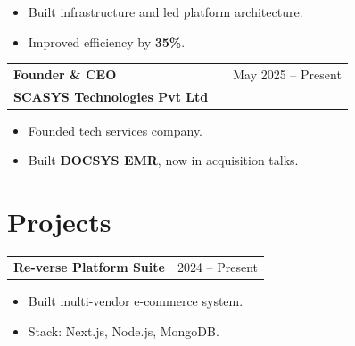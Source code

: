 \documentclass[a4paper,10pt]{article}
\begin{document}
\vspace{-6pt}

\begin{itemize}[nosep, leftmargin=1.5em]

\item Built infrastructure and led platform architecture.

\item Improved efficiency by \textbf{35\%}.

\end{itemize}



\begin{tabularx}{\linewidth}{ @{}l X r@{} }

\textbf{Founder \& CEO} & \hfill & \textcolor[HTML]{371e77}{May 2025 -- Present} \\

\textcolor[HTML]{371e77}{\textbf{SCASYS Technologies Pvt Ltd}} & & \\

\end{tabularx}

\vspace{-6pt}

\begin{itemize}[nosep, leftmargin=1.5em]

\item Founded tech services company.

\item Built \textbf{DOCSYS EMR}, now in acquisition talks.

\end{itemize}




\section{Projects}



\begin{tabularx}{\linewidth}{ @{}l r@{} }

\textbf{Re-verse Platform Suite} & \textcolor[HTML]{371e77}{2024 -- Present} \\

\end{tabularx}

\vspace{-6pt}

\begin{itemize}[nosep, leftmargin=1.5em]

\item Built multi-vendor e-commerce system.

\item Stack: Next.js, Node.js, MongoDB.

\end{itemize}
\end{document}

